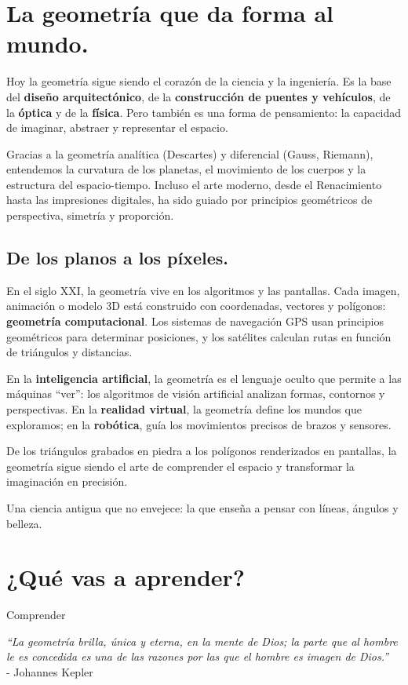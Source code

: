 \section*{La geometría que da forma al mundo.}

\begin{reseñaplana}
Hoy la geometría sigue siendo el corazón de la ciencia y la ingeniería.  
Es la base del \textbf{diseño arquitectónico}, de la \textbf{construcción de puentes y vehículos}, de la \textbf{óptica} y de la \textbf{física}.  
Pero también es una forma de pensamiento: la capacidad de imaginar, abstraer y representar el espacio.  

Gracias a la geometría analítica (Descartes) y diferencial (Gauss, Riemann), entendemos la curvatura 
de los planetas, el movimiento de los cuerpos y la estructura del espacio-tiempo.  
Incluso el arte moderno, desde el Renacimiento hasta las impresiones digitales, ha sido guiado por 
principios geométricos de perspectiva, simetría y proporción.  

\subsection*{De los planos a los píxeles.}
En el siglo XXI, la geometría vive en los algoritmos y las pantallas.  
Cada imagen, animación o modelo 3D está construido con coordenadas, vectores y polígonos: \textbf{geometría computacional}.  
Los sistemas de navegación GPS usan principios geométricos para determinar posiciones, y los satélites calculan 
rutas en función de triángulos y distancias.  

En la \textbf{inteligencia artificial}, la geometría es el lenguaje oculto que permite a las máquinas “ver”: 
los algoritmos de visión artificial analizan formas, contornos y perspectivas.  
En la \textbf{realidad virtual}, la geometría define los mundos que exploramos; en la \textbf{robótica}, guía 
los movimientos precisos de brazos y sensores.  

De los triángulos grabados en piedra a los polígonos renderizados en pantallas, la geometría sigue 
siendo el arte de comprender el espacio y transformar la imaginación en precisión. 

Una ciencia antigua que no envejece: la que enseña a pensar con líneas, ángulos y belleza.
\end{reseñaplana}

\section*{¿Qué vas a aprender?}
\begin{aprende}
  \item Comprender 
\end{aprende}

\vspace{1cm}
\begin{flushright}
  {\oneptup\itshape ``La geometría brilla, única y eterna, en la mente de Dios; la parte que al hombre le es concedida es una de las razones por las que el hombre es imagen de Dios.''}\\
  {\oneptup - Johannes Kepler}
\end{flushright}


